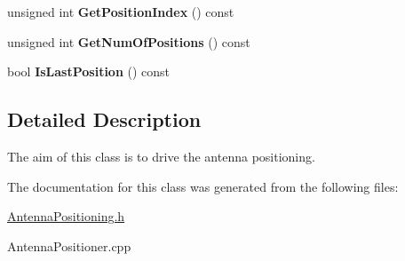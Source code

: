 \begin{DoxyCompactItemize}
\mbox{\label{classAntennaPositioner_aa77a4d7ef1dd79ae4253167ebaf66a5e}} 
unsigned int {\bfseries Get\+Position\+Index} () const
\item 
\mbox{\label{classAntennaPositioner_a62c014613a812a0d2948dcebb0b1c9dc}} 
unsigned int {\bfseries Get\+Num\+Of\+Positions} () const
\item 
\mbox{\label{classAntennaPositioner_a512104fe937395e266284eded6a8359d}} 
bool {\bfseries Is\+Last\+Position} () const
\end{DoxyCompactItemize}


\subsection{Detailed Description}
The aim of this class is to drive the antenna positioning. 

The documentation for this class was generated from the following files\+:\begin{DoxyCompactItemize}
\item 
\hyperlink{AntennaPositioning_8h}{Antenna\+Positioning.\+h}\item 
Antenna\+Positioner.\+cpp\end{DoxyCompactItemize}
